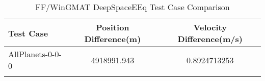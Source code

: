 \begin{table}[htbp!]
\centering
\caption{ FF/WinGMAT DeepSpaceEEq Test Case Comparison}
      \begin{tabular}{lcc}
      \hline\hline
          Test Case & Position Difference(m) & Velocity Difference(m/s) \\
         \hline
         AllPlanets-0-0-0 & 4918991.943 & 0.8924713253 \\
      \hline\hline
      \label{Table: DeepSpaceEEq FF-WinGMAT Table} 
\end{tabular}
\end{table}
